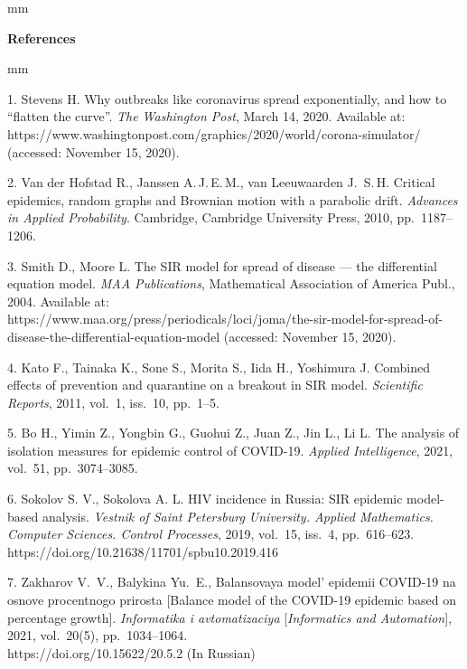 

{\small



 mm

\noindent \textbf{References} }

 mm

{\footnotesize



1. Stevens H. Why outbreaks like coronavirus spread exponentially, and
how to ``flatten the curve''. \textit{The Washington Post}, March 14, 2020. Available at: \\ https://www.washingtonpost.com/graphics/2020/world/corona-simulator/ (accessed: November 15, 2020).

2. Van der Hofstad R.,  Janssen A.\,J.\,E.\,M.,  van Leeuwaarden J.\, S.\,H. Critical epidemics, random graphs and Brownian motion with a parabolic drift. \textit{Advances in Applied Probability}. Cambridge, Cambridge University Press, 2010, pp.~1187--1206.

3. Smith D.,  Moore L. The SIR model for spread of disease --- the differential equation model. \textit{MAA Publications}, Mathematical Association of America Publ., 2004. Available at:\\
https://www.maa.org/press/periodicals/loci/joma/the-sir-model-for-spread-of-disease-the-differential-equation-model (accessed: November 15, 2020).

4. Kato F., Tainaka K., Sone S., Morita S., Iida H., Yoshimura J. Combined effects of prevention and quarantine on a breakout in SIR model. \textit{Scientific Reports}, 2011, vol.~1, iss.~10, pp.~1--5.

5. Bo H., Yimin Z., Yongbin G., Guohui Z., Juan Z., Jin L., Li L. The analysis of isolation measures for epidemic control of COVID-19.
{\it Applied Intelligence}, 2021, vol.~51, pp.~3074--3085.

6. Sokolov S. V., Sokolova A. L. HIV incidence in Russia: SIR epidemic model-based analysis. {\it Vestnik of Saint Petersburg University. Applied Mathematics. Computer Sciences. Control Processes}, 2019, vol.~15,
iss.~4, pp.~616--623.
https://doi.org/10.21638/11701/spbu10.2019.416

7. Zakharov V.~V., Balykina Yu.~E.,  Balansovaya model' epidemii COVID-19 na osnove procentnogo prirosta [Balance model of the COVID-19 epidemic based on percentage growth]. {\it Informatika i avtomatizaciya}
[{\it Informatics and Automation}], 2021, vol.~20(5), pp.~1034--1064.\\ https://doi.org/10.15622/20.5.2  (In Russian)

}
